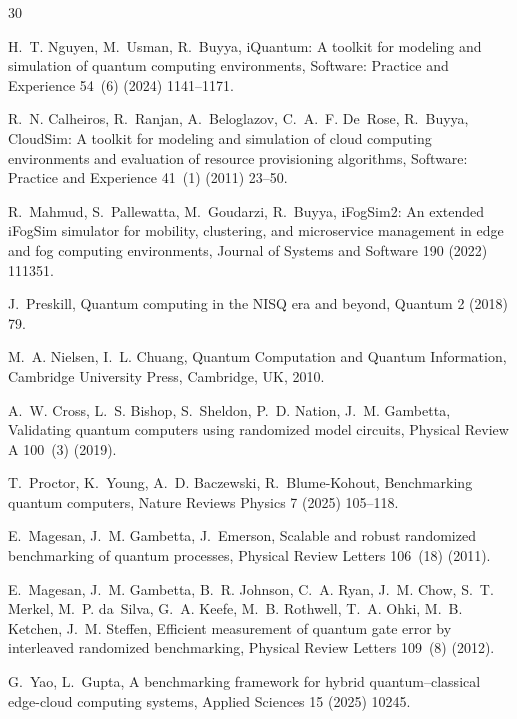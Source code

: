 
\begin{thebibliography}{30}

H.~T. Nguyen, M.~Usman, R.~Buyya,
iQuantum: A toolkit for modeling and simulation of quantum computing
environments,
Software: Practice and Experience 54~(6) (2024) 1141--1171.

R.~N. Calheiros, R.~Ranjan, A.~Beloglazov, C.~A.~F. De~Rose, R.~Buyya,
CloudSim: A toolkit for modeling and simulation of cloud computing environments
and evaluation of resource provisioning algorithms,
Software: Practice and Experience 41~(1) (2011) 23--50.

R.~Mahmud, S.~Pallewatta, M.~Goudarzi, R.~Buyya,
iFogSim2: An extended iFogSim simulator for mobility, clustering, and
microservice management in edge and fog computing environments,
Journal of Systems and Software 190 (2022) 111351.

J.~Preskill,
Quantum computing in the NISQ era and beyond,
Quantum 2 (2018) 79.

M.~A. Nielsen, I.~L. Chuang,
Quantum Computation and Quantum Information,
Cambridge University Press, Cambridge, UK, 2010.

A.~W. Cross, L.~S. Bishop, S.~Sheldon, P.~D. Nation, J.~M. Gambetta,
Validating quantum computers using randomized model circuits,
Physical Review A 100~(3) (2019).

T.~Proctor, K.~Young, A.~D. Baczewski, R.~Blume-Kohout,
Benchmarking quantum computers,
Nature Reviews Physics 7 (2025) 105--118.

E.~Magesan, J.~M. Gambetta, J.~Emerson,
Scalable and robust randomized benchmarking of quantum processes,
Physical Review Letters 106~(18) (2011).

E.~Magesan, J.~M. Gambetta, B.~R. Johnson, C.~A. Ryan, J.~M. Chow,
S.~T. Merkel, M.~P. da~Silva, G.~A. Keefe, M.~B. Rothwell, T.~A. Ohki,
M.~B. Ketchen, J.~M. Steffen,
Efficient measurement of quantum gate error by interleaved randomized
benchmarking,
Physical Review Letters 109~(8) (2012).

G.~Yao, L.~Gupta,
A benchmarking framework for hybrid quantum--classical edge-cloud computing
systems,
Applied Sciences 15 (2025) 10245.


\end{thebibliography}

